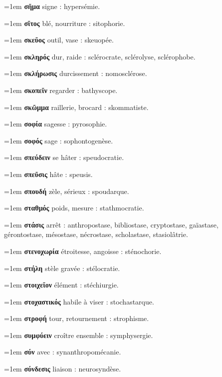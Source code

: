 \hangindent=1em \textbf{σῆμα} signe : hypersémie.\par
\hangindent=1em \textbf{σῖτος} blé, nourriture : sitophorie.\par
\hangindent=1em \textbf{σκεῦος} outil, vase : skeuopée.\par
\hangindent=1em \textbf{σκληρός} dur, raide : sclérocrate, sclérolyse, sclérophobe.\par
\hangindent=1em \textbf{σκλήρωσις} durcissement : nomosclérose.\par
\hangindent=1em \textbf{σκοπεῖν} regarder : bathyscope.\par
\hangindent=1em \textbf{σκῶμμα} raillerie, brocard : skommatiste.\par
\hangindent=1em \textbf{σοφία} sagesse : pyrosophie.\par
\hangindent=1em \textbf{σοφός} sage : sophontogenèse.\par
\hangindent=1em \textbf{σπεύδειν} se hâter : speudocratie.\par
\hangindent=1em \textbf{σπεῦσις} hâte : speusis.\par
\hangindent=1em \textbf{σπουδή} zèle, sérieux : spoudarque.\par
\hangindent=1em \textbf{σταθμός} poids, mesure : stathmocratie.\par
\hangindent=1em \textbf{στάσις} arrêt : anthropostase, bibliostase, cryptostase, gaïastase, gérontostase, mésostase, nécrostase, scholastase, stasiolâtrie.\par
\hangindent=1em \textbf{στενοχωρία} étroitesse, angoisse : sténochorie.\par
\hangindent=1em \textbf{στήλη} stèle gravée : stélocratie.\par
\hangindent=1em \textbf{στοιχεῖον} élément : stéchiurgie.\par
\hangindent=1em \textbf{στοχαστικός} habile à viser : stochastarque.\par
\hangindent=1em \textbf{στροφή} tour, retournement : strophisme.\par
\hangindent=1em \textbf{συμφύειν} croître ensemble : symphysergie.\par
\hangindent=1em \textbf{σύν} avec : synanthropomécanie.\par
\hangindent=1em \textbf{σύνδεσις} liaison : neurosyndèse.\par
